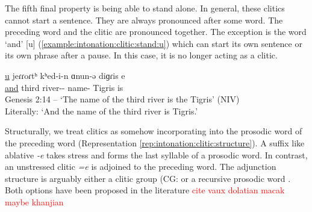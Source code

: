 The fifth final property is being able to stand alone. In general, these clitics cannot start a sentence. They are always pronounced after some word. The preceding word and the clitic are pronounced together. The exception is the word `and' [u] (\ref{example:intonation:clitic:stand:u}) which can start its own sentence or its own phrase after a pause. In this case, it is no longer acting as a clitic. 

\begin{exe}
	\ex \gll \underline{u} jeɾɾoɾtʰ kʰed-i-n ɑnun-ə diɡɾis e \\
	\underline{and} third river-{\gen}-{} name-{} Tigris is \\ 
	\trans Genesis 2:14 -- `The name of the third river is the Tigris' (NIV)
	\\ Literally: `And the name of the third river is Tigris.'\label{example:intonation:clitic:stand:u} \\
	
\end{exe}


Structurally, we treat clitics as somehow incorporating into the prosodic word of the preceding word (Representation \ref{rep:intonation:clitic:structure}). A suffix like ablative \textit{-e} takes stress and forms the last syllable of a prosodic word. In contrast, an unstressed clitic \textit{=e} is adjoined to the preceding word. The adjunction structure is arguably either a clitic group (CG: \citep{Nespor-Vogel-1986-ProsodicPhon,Vogel-2009-StatusCliticGroup} or a recursive prosodic word \citep{Ito-1989-ProsodicEpenthesis,Selkirk-1996-ProsodicFunctionWords,Booij-1996-CliticizationProsodicIntegrationDutch}. Both options have been proposed in the literature \textcolor{red}{cite vaux dolatian macak maybe khanjian}


